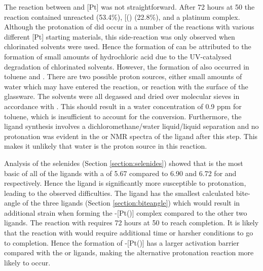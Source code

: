The reaction between \tBusixantphos{} and [Pt] was not straightforward.  After 72 hours at 50\degC{} the reaction contained unreacted \tBusixantphos{} (53.4\%), [(\tBusixantphos)\ce{H]+} (22.8\%), and a platinum complex.  Although the protonation of \tButhixantphos{} did occur in a number of the reactions with various different [Pt] starting materials, this side-reaction was only observed when chlorinated solvents were used.  Hence the formation of \tButhixantphos {} can be attributed to the formation of small amounts of hydrochloric acid due to the UV-catalysed degradation of chlorinated solvents.  However, the formation of \tBusixantphos {} also occurred in toluene and .  There are two possible proton sources, either small amounts of water which may have entered the reaction, or reaction with the surface of the glassware.  The solvents were all degassed and dried over molecular sieves in accordance with .  This should result in a water concentration of 0.9 ppm for toluene, which is insufficient to account for the conversion.\cite{Williams2010}  Furthermore, the \tBusixantphos{} ligand synthesis involves a dichloromethane/water liquid/liquid separation and no protonation was evident in the \proton{} or \phosphorus{} NMR spectra of the \tBusixantphos{} ligand after this step.  This makes it unlikely that water is the proton source in this reaction.  

Analysis of the \tBuxantphos{} selenides (Section \ref{section:selenides}) showed that \tBusixantphos{} is the most basic of all of the ligands with a \pKb{} of 5.67 compared to 6.90 and 6.72 for \tButhixantphos{} and \tBuxantphos{} respectively.  Hence the \tBusixantphos{} ligand is significantly more susceptible to protonation, leading to the observed difficulties.  The \tBusixantphos{} ligand has the smallest calculated bite-angle of the three ligands (Section \ref{section:biteangle}) which would result in additional strain when forming the \trans-[Pt(\tBusixantphos)] complex compared to the other two ligands.  The reaction with \tButhixantphos{} requires 72 hours at 50 \degC{} to reach completion.  It is likely that the reaction with \tBusixantphos{} would require additional time or harsher conditions to go to completion.  Hence the formation of \trans-[Pt(\tBusixantphos)] has a larger activation barrier compared with the \tButhixantphos{} or \tBuxantphos{} ligands, making the alternative protonation reaction more likely to occur.  

